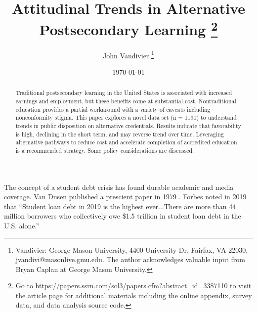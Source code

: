 \documentclass[AER]{./aea-latex-templates/AEA}
\begin{document}
        
        \title{Attitudinal Trends in Alternative Postsecondary Learning
            \thanks{Go to \url{https://papers.ssrn.com/sol3/papers.cfm?abstract_id=3387110} to visit the article page for additional materials including the online appendix, survey data, and data analysis source code.}}
        \author{John Vandivier
            \thanks{Vandivier: George Mason University, 4400 University Dr, Fairfax, VA 22030, jvandivi@masonlive.gmu.edu. The author acknowledges valuable input from Bryan Caplan at George Mason University.}}
        \date{\today}
        
        \begin{abstract}
        Traditional postsecondary learning in the United States is associated
        with increased earnings and employment, but these benefits come at
        substantial cost. Nontraditional education provides a partial workaround
        with a variety of caveats including nonconformity stigma. This paper
        explores a novel data set (n = 1190) to understand trends in public
        disposition on alternative credentials. Results indicate that
        favorability is high, declining in the short term, and may reverse trend
        over time. Leveraging alternative pathways to reduce cost and accelerate
        completion of accredited education is a recommended strategy. Some
        policy considerations are discussed.
        \end{abstract}
        
        \maketitle
        
        The concept of a student debt crisis has found durable academic and media
        coverage. Van Dusen published a prescient paper in 1979 \cite{van1979coming}. Forbes noted in 2019\cite{friedman2018student} that “Student loan
        debt in 2019 is the highest ever...There are more than 44 million borrowers
        who collectively owe \$1.5 trillion in student loan debt in the U.S.
        alone.”
        
\end{document}
